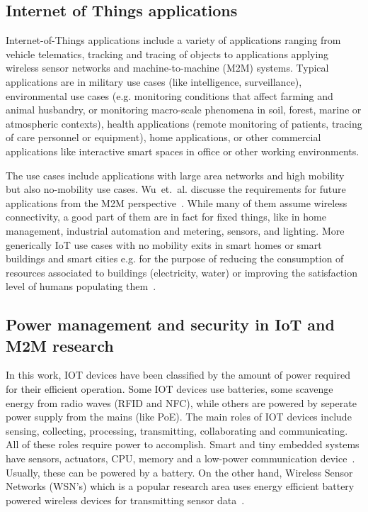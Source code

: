 \documentclass[final]{siamltex}
\begin{document}
\subsection{Internet of Things applications}

Internet-of-Things applications include a variety of applications
ranging from vehicle telematics, tracking and tracing of objects to
applications applying wireless sensor networks and machine-to-machine
(M2M) systems. Typical applications are in military use cases (like
intelligence, surveillance), environmental use cases (e.g. monitoring
conditions that affect farming and animal husbandry, or monitoring
macro-scale phenomena in soil, forest, marine or atmospheric
contexts), health applications (remote monitoring of patients, tracing
of care personnel or equipment), home applications, or other
commercial applications like interactive smart spaces in office or
other working environments.

The use cases include applications with large area networks and high
mobility but also no-mobility use cases. Wu~et.~al. discusse the
requirements for future applications from the M2M
perspective~\cite{wu2011m2m}. While many of them assume wireless
connectivity, a good part of them are in fact for fixed things, like
in home management, industrial automation and metering, sensors, and
lighting. More generically IoT use cases with no mobility exits in
smart homes or smart buildings and smart cities e.g. for the purpose
of reducing the consumption of resources associated to buildings
(electricity, water) or improving the satisfaction level of humans
populating them~\cite{miorandi2012internet}.

\subsection{Power management and security in IoT and M2M research}

In this work, IOT devices have been classified by the amount of power required
for their efficient operation. Some IOT devices use batteries, some scavenge
energy from radio waves (RFID and NFC), while others are powered by seperate
power supply from the mains (like PoE).  The main roles of IOT devices include
sensing, collecting, processing, transmitting, collaborating and communicating.
All of these roles require power to accomplish. Smart and tiny embedded systems
have sensors, actuators, CPU, memory and a low-power communication
device~\cite{lopez2012adding}. Usually, these can be powered by a battery. On
the other hand, Wireless Sensor Networks (WSN's) which is a popular research
area uses energy efficient battery powered wireless devices for transmitting
sensor data~\cite{akyildiz2002wireless}.
\end{document}
